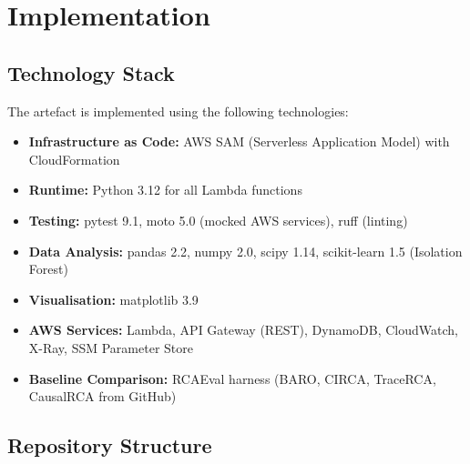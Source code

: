 \chapter{Implementation}

\section{Technology Stack}

The artefact is implemented using the following technologies:

\begin{itemize}
    \item \textbf{Infrastructure as Code:} AWS SAM (Serverless Application Model) with CloudFormation
    \item \textbf{Runtime:} Python 3.12 for all Lambda functions
    \item \textbf{Testing:} pytest 9.1, moto 5.0 (mocked AWS services), ruff (linting)
    \item \textbf{Data Analysis:} pandas 2.2, numpy 2.0, scipy 1.14, scikit-learn 1.5 (Isolation Forest)
    \item \textbf{Visualisation:} matplotlib 3.9
    \item \textbf{AWS Services:} Lambda, API Gateway (REST), DynamoDB, CloudWatch, X-Ray, SSM Parameter Store
    \item \textbf{Baseline Comparison:} RCAEval harness (BARO, CIRCA, TraceRCA, CausalRCA from GitHub)
\end{itemize}

\section{Repository Structure}

